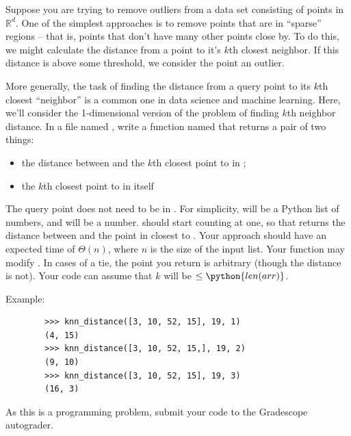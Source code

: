 \begin{progprob}
    Suppose you are trying to remove outliers from a data set consisting of
    points in $\mathbb R^d$. One of the simplest approaches is to remove points
    that are in ``sparse'' regions -- that is, points that don't have many
    other points close by. To do this, we might calculate the distance from a
    point to it's $k$th closest neighbor. If this distance is above some
    threshold, we consider the point an outlier.

    More generally, the task of finding the distance from a query point to its
    $k$th closest ``neighbor'' is a common one in data science and machine
    learning.
    Here, we'll consider the 1-dimensional version of the problem of
    finding $k$th neighbor distance. In a file named ,
    write a function named  that returns a
    pair of two things:

    \begin{itemize}
        \item the distance between  and the $k$th closest point to 
            in ;
        \item the $k$th closest point to  in  itself
    \end{itemize}

    The query point  does not need to be in
    . For simplicity,  will be a Python list of numbers,
    and  will be a number.  should start counting at one,
    so that  returns the distance between
     and the point in  closest to . Your
    approach should have an expected time of $\Theta(n)$, where $n$ is the
    size of the input list. Your function may modify . In cases
    of a tie, the point you return is arbitrary (though the distance is not).
    Your code can assume that $k$ will be $\leq \python{len(arr)}$.

    Example:
    \begin{verbatim}
        >>> knn_distance([3, 10, 52, 15], 19, 1)
        (4, 15)
        >>> knn_distance([3, 10, 52, 15,], 19, 2)
        (9, 10)
        >>> knn_distance([3, 10, 52, 15], 19, 3)
        (16, 3)
    \end{verbatim}

    As this is a programming problem, submit your code to the Gradescope
    autograder.


\end{progprob}
